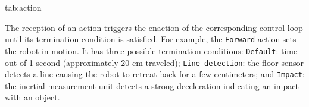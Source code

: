 \documentclass[pmlr]{jmlr}%
\begin{document}
\begin{table}[htbp]
	\floatconts
	{tab:action}
	{\caption{Actions available to the robot and their possible outcomes}}
	{%
		\qquad
	}
\end{table}

The reception of an action triggers the enaction of the corresponding control loop until its termination condition is satisfied.
For example, the \texttt{Forward} action sets the robot in motion. 
It has three possible termination conditions: 
\texttt{Default}: time out of 1 second (approximately 20 cm traveled);
\texttt{Line detection}: the floor sensor detects a line causing the robot to retreat back for a few centimeters; and
\texttt{Impact}: the inertial measurement unit detects a strong deceleration indicating an impact with an object.
\end{document}
